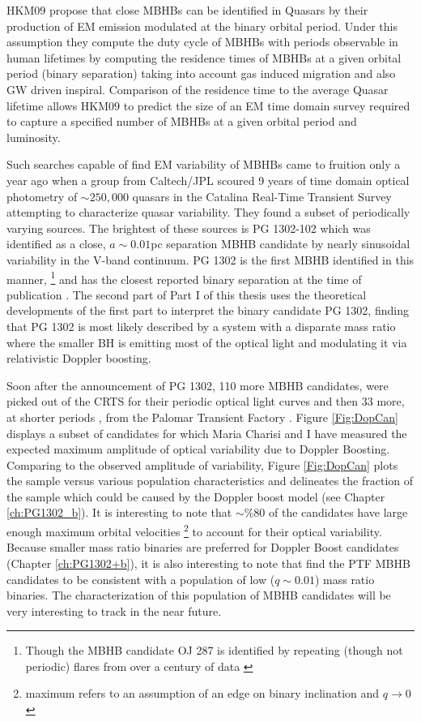 HKM09 propose that close MBHBs can be identified in Quasars by their
production of EM emission modulated at the binary orbital period. Under this
assumption they compute the duty cycle of MBHBs with periods observable in
human lifetimes by computing the residence times of MBHBs at a given orbital
period (binary separation) taking into account gas induced migration and also
GW driven inspiral. Comparison of the residence time to the average Quasar
lifetime allows HKM09 to predict the size of an EM time domain survey required
to capture a specified number of MBHBs at a given orbital period and
luminosity.


Such searches capable of find EM variability of MBHBs came to fruition only a
year ago when a group from Caltech/JPL scoured 9 years of time domain optical
photometry of $\sim250,000$ quasars in the Catalina Real-Time Transient
Survey \citep[CRTS][]{CRTS1:Drake:2009, CRTS2:Djorgovski:2010,
CRTS3:2011Mahabal, CRTS4:Djorgovski:2011} attempting to characterize quasar
variability. They found a subset of periodically varying sources. The
brightest of these sources is PG 1302-102 which was identified as a close, $a
\sim 0.01$pc separation MBHB candidate by nearly sinusoidal variability in the
V-band continuum. PG 1302 is the first MBHB identified in this manner,
\footnote{Though the MBHB candidate OJ 287 is identified by repeating (though
not periodic) flares from over a century of data \citep{LehtoValtonen:1996,
Pursimo:2000}} and has the closest reported binary separation at the time of
publication \citep{Graham+2015a}. The second part of Part I of this thesis
uses the theoretical developments of the first part to interpret the binary
candidate PG 1302, finding that PG 1302 is most likely described by a system
with a disparate mass ratio where the smaller BH is emitting most of the
optical light and modulating it via relativistic Doppler boosting.


Soon after the announcement of PG 1302, 110 more MBHB candidates, were picked
out of the CRTS for their periodic optical light curves \citep{Graham+2015b}
and then 33 more, at shorter periods \citep{Charisi+2016}, from the Palomar
Transient Factory \citep[PTF][]{Rau:2009, Law:2009}. Figure \ref{Fig:DopCan}
displays a subset of candidates for which Maria Charisi and I have measured
the expected maximum amplitude of optical variability due to Doppler Boosting.
Comparing to the observed amplitude of variability, Figure \ref{Fig:DopCan}
plots the sample versus various population characteristics and delineates the
fraction of the sample which could be caused by the Doppler boost model (see
Chapter \ref{ch:PG1302_b}). It is interesting to note that $\sim \% 80$ of
the candidates have large enough maximum orbital velocities \footnote{maximum
refers to an assumption of an edge on binary inclination and $q \rightarrow
0$} to account for their optical variability. Because smaller mass ratio
binaries are preferred for Doppler Boost candidates (Chapter
\ref{ch:PG1302+b}), it is also interesting to note that \citep{Charisi+2016}
find the PTF MBHB candidates to be consistent with a population of low
($q\sim0.01$) mass ratio binaries. The characterization of this population of
MBHB candidates will be very interesting to track in the near future.


